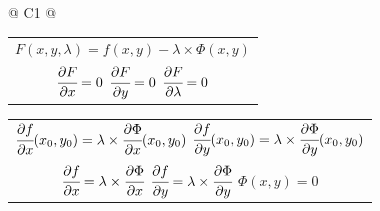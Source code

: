 \begin{longtable}{
		@{}
		C{1\textwidth} 
		@{}}
{\begin{tabular}[c]{@{}c@{}}
				$F(x, y, \lambda) = f(x, y) - \lambda \times \Phi (x, y)$ \\

				$\cfrac{\partial F}{\partial x} = 0$ \hspace{1cm} $\cfrac{\partial F}{\partial y} = 0$ \hspace{1cm} $\cfrac{\partial F}{\partial \lambda} = 0$

			\end{tabular}}
			\tabularnewline
			\midrule
			{\large \begin{tabular}[c]{@{}c@{}}

				$\cfrac{\partial f}{\partial x} (x_{0}, y_{0}) = \lambda \times \cfrac{\partial \Phi}{\partial x} (x_{0}, y_{0})$ \hspace{1cm} $\cfrac{\partial f}{\partial y} (x_{0}, y_{0}) = \lambda \times \cfrac{\partial \Phi}{\partial y} (x_{0}, y_{0})$ \\

				$\cfrac{\partial f}{\partial x} = \lambda \times \cfrac{\partial \Phi}{\partial x}$ \hspace{1cm} $\cfrac{\partial f}{\partial y} = \lambda \times \cfrac{\partial \Phi}{\partial y}$ \hspace{1cm} $\Phi (x, y) = 0$

			\end{tabular}}
			\tabularnewline
			\bottomrule

		\end{longtable}